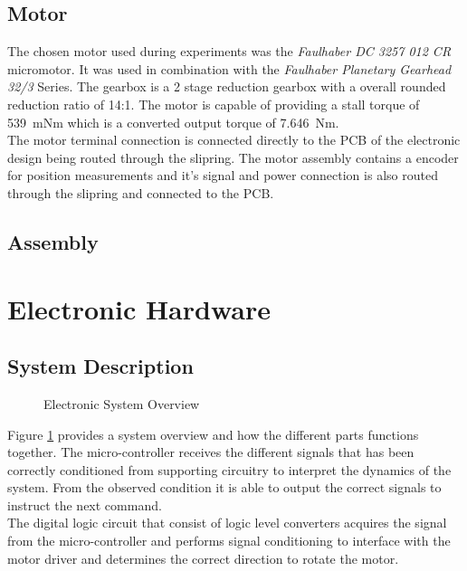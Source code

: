 \subsection{Motor}
The chosen motor used during experiments was the \textit{Faulhaber DC 3257 012 CR} micromotor. It was used in combination with the \textit{Faulhaber Planetary Gearhead 32/3} Series. The gearbox is a 2 stage reduction gearbox with a overall rounded reduction ratio of 14:1. The motor is capable of providing a stall torque of \SI{539}{mNm} which is a converted output torque of \SI{7.646}{Nm}.\\

The motor terminal connection is connected directly to the PCB of the electronic design being routed through the slipring. The motor assembly contains a encoder for position measurements and it's signal and power connection is also routed through the slipring and connected to the PCB.
\subsection{Assembly}



\section{Electronic Hardware}
\subsection{System Description}

\begin{figure}[h]
	\centering
	
	\caption{Electronic System Overview}
	\label{fig:electronicSystemOverview}
\end{figure}



Figure \ref{fig:electronicSystemOverview} provides a system overview and how the different parts functions together. The micro-controller receives the different signals that has been correctly conditioned from supporting circuitry to interpret the dynamics of the system. From the observed condition it is able to output the correct signals to instruct the next command.\\

The digital logic circuit that consist of logic level converters acquires the signal from the micro-controller and performs signal conditioning to interface with the motor driver and determines the correct direction to rotate the motor. \\


